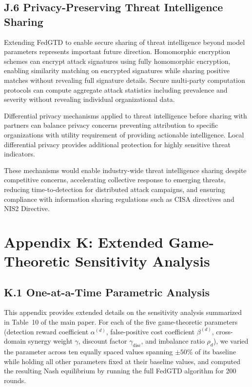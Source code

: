 \documentclass[12pt,a4paper]{article}
\theoremstyle{definition}
\begin{document}
\subsection{J.6 Privacy-Preserving Threat Intelligence Sharing}

Extending FedGTD to enable secure sharing of threat intelligence beyond model parameters represents important future direction. Homomorphic encryption schemes can encrypt attack signatures using fully homomorphic encryption, enabling similarity matching on encrypted signatures while sharing positive matches without revealing full signature details. Secure multi-party computation protocols can compute aggregate attack statistics including prevalence and severity without revealing individual organizational data.

Differential privacy mechanisms applied to threat intelligence before sharing with partners can balance privacy concerns preventing attribution to specific organizations with utility requirement of providing actionable intelligence. Local differential privacy provides additional protection for highly sensitive threat indicators.

These mechanisms would enable industry-wide threat intelligence sharing despite competitive concerns, accelerating collective response to emerging threats, reducing time-to-detection for distributed attack campaigns, and ensuring compliance with information sharing regulations such as CISA directives and NIS2 Directive.


\section{Appendix K: Extended Game-Theoretic Sensitivity Analysis}
\label{sec:extended_sensitivity}

\subsection{K.1 One-at-a-Time Parametric Analysis}

This appendix provides extended details on the sensitivity analysis summarized in Table~10 of the main paper. For each of the five game-theoretic parameters (detection reward coefficient $\alpha^{(d)}$, false-positive cost coefficient $\beta^{(d)}$, cross-domain synergy weight $\gamma$, discount factor $\gamma_{\text{disc}}$, and imbalance ratio $\rho_d$), we varied the parameter across ten equally spaced values spanning $\pm 50\%$ of its baseline while holding all other parameters fixed at their baseline values, and computed the resulting Nash equilibrium by running the full FedGTD algorithm for 200 rounds.
\end{document}
